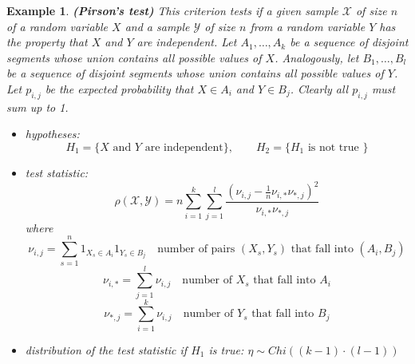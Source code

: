 \documentclass[12pt]{article}
\newtheorem{example}[theorem]{Example}
\begin{document}
\begin{example} \textbf{(Pirson's test)} This criterion tests if a given sample
    $\mathscr{X}$ of size $n$ of a random variable $X$ and a sample
    $\mathscr{Y}$ of size $n$ from a random variable $Y$ has the property that
    $X$ and $Y$ are independent. Let $A_1,\ldots,A_k$ be a sequence of disjoint
    segments whose union contains all possible values of $X$. Analogously, let
    $B_1,\ldots,B_l$ be a sequence of disjoint segments whose union contains all
    possible values of $Y$. Let $p_{i,j}$ be the expected probability that $X\in
        A_i$ and $Y\in B_j$. Clearly all $p_{i,j}$ must sum up to 1.
    \begin{itemize}
        \item hypotheses:
              $$H_1=\{X\mbox{ and }Y\mbox{ are independent}\},\quad\quad
                  H_2=\{H_1\mbox{ is not true }\}$$
        \item test statistic:
              $$
                  \rho(\mathscr{X},\mathscr{Y})
                  =n\sum_{i=1}^k\sum_{j=1}^l\frac{
                      {\left(\nu_{i,j}-\frac{1}{n}\nu_{i,*}\nu_{*,j}\right)}^2
                  }{\nu_{i,*}\nu_{*,j}}
              $$
              where
              $$
                  \nu_{i,j}=\sum_{s=1}^n 1_{X_s\in A_i}1_{Y_s\in B_j}
                  \quad \mbox{number of pairs }(X_s,Y_s)
                  \mbox{ that fall into }(A_i,B_j)
              $$
              $$
                  \nu_{i,*}=\sum_{j=1}^{l}\nu_{i,j}
                  \quad \mbox{number of }X_s\mbox{ that fall into }A_i
              $$
              $$
                  \nu_{*,j}=\sum_{i=1}^{k}\nu_{i,j}
                  \quad \mbox{number of }Y_s\mbox{ that fall into }B_j
              $$

        \item distribution of the test statistic if $H_1$ is true:
              $\eta\sim Chi((k-1)\cdot(l-1))$
    \end{itemize}
\end{example}
\end{document}

